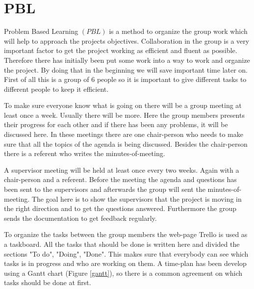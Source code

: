 \section{PBL} 

Problem Based Learning $(PBL)$ is a method to organize the group work which will help to approach the projects objectives. Collaboration in the group is a very important factor to get the project working as efficient and fluent as possible.
Therefore there has initially been put some work into a way to work and organize the project. By doing that in the beginning we will save important time later on.
First of all this is a group of 6 people so it is important to give different tasks to different people to keep it efficient. 

To make sure everyone know what is going on there will be a group meeting at least once a week. Usually there will be more. Here the group members presents their progress for each other and if there has been any problems, it will be discussed here. In these meetings there are one chair-person who needs to make sure that all the topics of the agenda is being discussed. Besides the chair-person there is a referent who writes the minutes-of-meeting. 

A supervisor meeting will be held at least once every two weeks. Again with a chair-person and a referent. Before the meeting the agenda and questions has been sent to the supervisors and afterwards the group will sent the minutes-of-meeting. The goal here is to show the supervisors that the project is moving in the right direction and to get the questions answered. Furthermore the group sends the documentation to get feedback regularly.

To organize the tasks between the group members the web-page Trello is used as a taskboard. All the tasks that should be done is written here and divided the sections "To do", "Doing", "Done". This makes sure that everybody can see which tasks is in progress and who are working on them. A time-plan has been develop using a Gantt chart (Figure \ref{gantt}), so there is a common agreement on which tasks should be done at first.              
